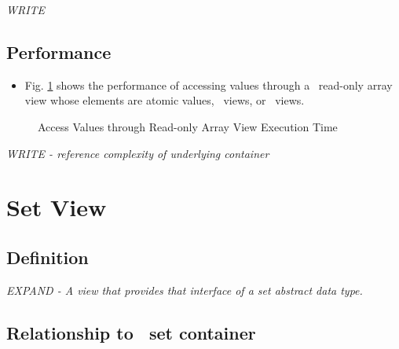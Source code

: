 \textit{WRITE}

\subsection{Performance} \label{sec-aryro-vw-perf}

\begin{itemize}
\item
Fig. \ref{fig:roary-vw-access-exper}
shows the performance of accessing values through a \stapl\ read-only array view
whose elements are atomic values, \stl\ views, or \stapl\ views.
\end{itemize}


\begin{figure}[p]
\caption{Access Values through Read-only Array View Execution Time}
\label{fig:roary-vw-access-exper}
\end{figure}

\emph{WRITE - reference complexity of underlying container}


\section{Set View} \label{sec-set-vw}

\subsection{Definition}

\textit{EXPAND - A view that provides that interface of a set abstract data type.}

\subsection{Relationship to \stapl\ set container}

